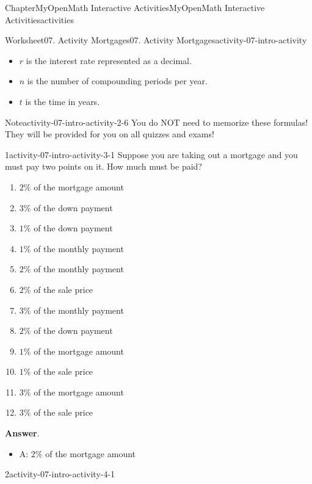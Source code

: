 \documentclass[oneside,10pt,]{book}
\newcommand{\blocktitlefont}{\relax}
\newcommand{\ptxlistdisc}{\raisebox{0.3ex}{\textbullet}}
\begin{document}
\begin{chapterptx}{Chapter}{MyOpenMath Interactive Activities}{}{MyOpenMath Interactive Activities}{}{}{activities}
\begin{worksheet-section}{Worksheet}{07. Activity Mortgages}{}{07. Activity Mortgages}{}{}{activity-07-intro-activity}
\begin{itemize}[label=\ptxlistdisc]
\item{}\(r\) is the interest rate represented as a decimal.%
\item{}\(n\) is the number of compounding periods per year.%
\item{}\(t\) is the time in years.%
\end{itemize}
%
\begin{note}{Note}{}{activity-07-intro-activity-2-6}%
You do NOT need to memorize these formulas! They will be provided for you on all quizzes and exams!%
\end{note}
\clearpage
\begin{divisionexercise}{1}{}{}{activity-07-intro-activity-3-1}%
Suppose you are taking out a mortgage and you must pay two points on it. How much must be paid?%
\par
%
\begin{enumerate}[label={(\alph*)}]
\item{}\(\displaystyle{2}\%\) of the mortgage amount%
\item{}\(\displaystyle{3}\%\) of the down payment%
\item{}\(\displaystyle{1}\%\) of the down payment%
\item{}\(\displaystyle{1}\%\) of the monthly payment%
\item{}\(\displaystyle{2}\%\) of the monthly payment%
\item{}\(\displaystyle{2}\%\) of the sale price%
\item{}\(\displaystyle{3}\%\) of the monthly payment%
\item{}\(\displaystyle{2}\%\) of the down payment%
\item{}\(\displaystyle{1}\%\) of the mortgage amount%
\item{}\(\displaystyle{1}\%\) of the sale price%
\item{}\(\displaystyle{3}\%\) of the mortgage amount%
\item{}\(\displaystyle{3}\%\) of the sale price%
\end{enumerate}
%
\par\smallskip%
\noindent\textbf{\blocktitlefont Answer}.\hypertarget{activity-07-intro-activity-3-1-2}{}\quad{}%
\begin{itemize}[label=\ptxlistdisc]
\item{}A: \(\displaystyle{2}\%\) of the mortgage amount%
\end{itemize}
%
\end{divisionexercise}%
\clearpage
\begin{divisionexercise}{2}{}{}{activity-07-intro-activity-4-1}%

\end{divisionexercise}
\end{worksheet-section}
\end{chapterptx}
\end{document}
